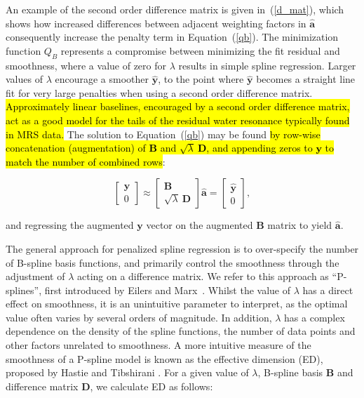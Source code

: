 \documentclass[num-refs]{wiley-article}
\newcommand{\revone}[2]{\hl{#1}\marginnote{\hl{#2}}}
\begin{document}
An example of the second order difference matrix is given in~(\ref{d_mat}), which shows how increased differences between adjacent weighting factors in $\hat{\mathbf{a}}$ consequently increase the penalty term in Equation~(\ref{qb}). The minimization function $Q_{B}$ represents a compromise between minimizing the fit residual and smoothness, where a value of zero for $\lambda$ results in simple spline regression. Larger values of $\lambda$ encourage a smoother $\hat{\mathbf{y}}$, to the point where $\hat{\mathbf{y}}$ becomes a straight line fit for very large penalties when using a second order difference matrix. \revone{Approximately linear baselines, encouraged by a second order difference matrix, act as a good model for the tails of the residual water resonance typically found in MRS data.}{R1.6} The solution to Equation~(\ref{qb}) may be found \revone{by row-wise concatenation (augmentation) of $\mathbf{B}$ and $\sqrt{\lambda} \ \mathbf{D}$, and appending zeros to $\mathbf{y}$ to match the number of combined rows}{R1.7}:

\begin{equation}
  \begin{bmatrix}
    \mathbf{y} \\ 0
  \end{bmatrix}
  \approx
  \begin{bmatrix}
    \mathbf{B} \\ \sqrt{\lambda} \ \mathbf{D}
  \end{bmatrix} \hat{\mathbf{a}} =
  \begin{bmatrix}
    \hat{\mathbf{y}} \\ 0
  \end{bmatrix},
  \label{p-spline_eq}
\end{equation}

and regressing the augmented $\mathbf{y}$ vector on the augmented $\mathbf{B}$ matrix to yield $\hat{\mathbf{a}}$.

The general approach for penalized spline regression is to over-specify the number of B-spline basis functions, and primarily control the smoothness through the adjustment of $\lambda$ acting on a difference matrix. We refer to this approach as ``P-splines'', first introduced by Eilers and Marx~\cite{Eilers1996}. Whilst the value of $\lambda$ has a direct effect on smoothness, it is an unintuitive parameter to interpret, as the optimal value often varies by several orders of magnitude. In addition, $\lambda$ has a complex dependence on the density of the spline functions, the number of data points and other factors unrelated to smoothness. A more intuitive measure of the smoothness of a P-spline model is known as the effective dimension (ED), proposed by Hastie and Tibshirani \cite{Hastie1990}. For a given value of $\lambda$, B-spline basis $\mathbf{B}$ and difference matrix $\mathbf{D}$, we calculate ED as follows:
\end{document}
